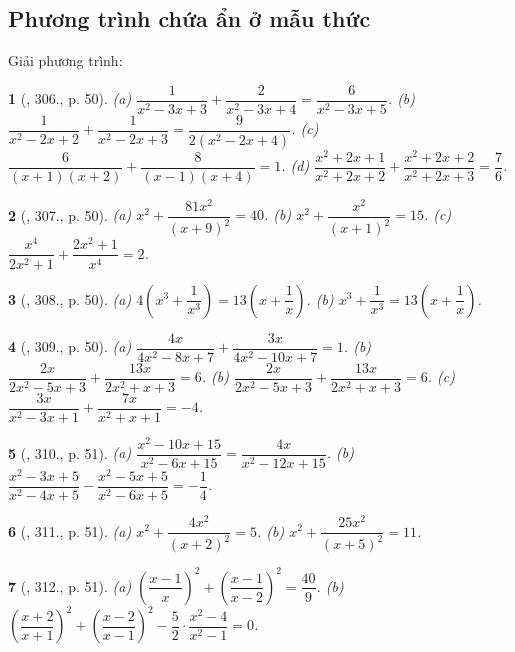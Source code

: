 \documentclass{article}
\newtheorem{baitoan}{}
\begin{document}
\subsection{Phương trình chứa ẩn ở mẫu thức}
Giải phương trình:

\begin{baitoan}[\cite{Binh_Toan_9_tap_2}, 306., p. 50]
	(a) $\dfrac{1}{x^2 - 3x + 3} + \dfrac{2}{x^2 - 3x + 4} = \dfrac{6}{x^2 - 3x + 5}$. (b) $\dfrac{1}{x^2 - 2x + 2} + \dfrac{1}{x^2 - 2x + 3} = \dfrac{9}{2(x^2 - 2x + 4)}$. (c) $\dfrac{6}{(x + 1)(x + 2)} + \dfrac{8}{(x - 1)(x + 4)} = 1$. (d) $\dfrac{x^2 + 2x + 1}{x^2 + 2x + 2} + \dfrac{x^2 + 2x + 2 }{x^2 + 2x + 3} = \dfrac{7}{6}$.
\end{baitoan}

\begin{baitoan}[\cite{Binh_Toan_9_tap_2}, 307., p. 50]
	(a) $x^2 + \dfrac{81x^2}{(x + 9)^2} = 40$. (b) $x^2 + \dfrac{x^2}{(x + 1)^2} = 15$. (c) $\dfrac{x^4}{2x^2 + 1} + \dfrac{2x^2 + 1}{x^4} = 2$.
\end{baitoan}

\begin{baitoan}[\cite{Binh_Toan_9_tap_2}, 308., p. 50]
	(a) $4\left(x^3 + \dfrac{1}{x^3}\right) = 13\left(x + \dfrac{1}{x}\right)$. (b) $x^3 + \dfrac{1}{x^3} = 13\left(x + \dfrac{1}{x}\right)$.
\end{baitoan}

\begin{baitoan}[\cite{Binh_Toan_9_tap_2}, 309., p. 50]
	(a) $\dfrac{4x}{4x^2 - 8x + 7} + \dfrac{3x}{4x^2 - 10x + 7} = 1$. (b) $\dfrac{2x}{2x^2 - 5x + 3} + \dfrac{13x}{2x^2 + x + 3} = 6$. (b) $\dfrac{2x}{2x^2 - 5x + 3} + \dfrac{13x}{2x^2 + x + 3} = 6$. (c) $\dfrac{3x}{x^2 - 3x + 1} + \dfrac{7x}{x^2 + x + 1} = -4$.
\end{baitoan}

\begin{baitoan}[\cite{Binh_Toan_9_tap_2}, 310., p. 51]
	(a) $\dfrac{x^2 - 10x + 15}{x^2 - 6x + 15} = \dfrac{4x}{x^2 - 12x + 15}$. (b) $\dfrac{x^2 - 3x + 5}{x^2 - 4x + 5} - \dfrac{x^2 - 5x + 5}{x^2 - 6x + 5} = -\dfrac{1}{4}$.
\end{baitoan}

\begin{baitoan}[\cite{Binh_Toan_9_tap_2}, 311., p. 51]
	(a) $x^2 + \dfrac{4x^2}{(x + 2)^2} = 5$. (b) $x^2 + \dfrac{25x^2}{(x + 5)^2} = 11$.
\end{baitoan}

\begin{baitoan}[\cite{Binh_Toan_9_tap_2}, 312., p. 51]
	(a) $\left(\dfrac{x - 1}{x}\right)^2 + \left(\dfrac{x - 1}{x - 2}\right)^2 = \dfrac{40}{9}$. (b) $\left(\dfrac{x + 2}{x + 1}\right)^2 + \left(\dfrac{x - 2}{x - 1}\right)^2 - \dfrac{5}{2}\cdot\dfrac{x^2 - 4}{x^2 - 1} = 0$.
\end{baitoan}
\end{document}
